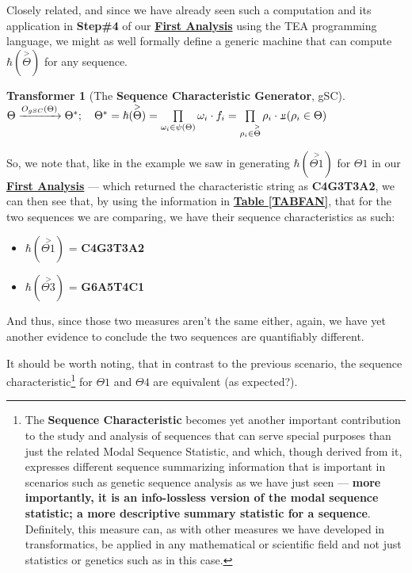 \documentclass[a4paper, 18pt]{book} %
\newtheorem{transf}{Transformer}
\newcommand{\invpi}{\rotatebox[origin=c]{180}{$\pi$}}
\begin{document}
Closely related, and since we have already seen such a computation and its application in \textbf{Step\#4} of our \textbf{\hyperref[SECFANAL]{First Analysis}} using the TEA programming language, we might as well formally define a generic machine that can compute $\hbar(\overset{>}{\Theta})$ for any sequence.\\

\begin{transf}[The \textbf{Sequence Characteristic Generator}, gSC]
\label{TRANSFGENSEQCHAR}
$ $\\
$\Theta \xrightarrow{O_{gSC}(\Theta)} \Theta^*; \quad \Theta^* = \hbar(\overset{>}{\Theta}) = \prod\limits_{\omega_i \in \psi(\Theta)} \omega_i\cdot f_i = \prod\limits_{\rho_i \in \overset{>}{\Theta}} \rho_i\cdot \invpi(\rho_i \in \Theta)$
\end{transf}

So, we note that, like in the example we saw in generating $\hbar(\overset{>}{\Theta1})$ for $\Theta1$ in our \textbf{\hyperref[SECFANAL]{First Analysis}} --- which returned the characteristic string as \textbf{C4G3T3A2}, we can then see that, by using the information in \textbf{\hyperref[TABFAN]{Table \ref{TABFAN}}}, that for the two sequences we are comparing, we have their sequence characteristics as such:

\begin{itemize}
\item $\hbar(\overset{>}{\Theta1})$ = \textbf{C4G3T3A2}
\item $\hbar(\overset{>}{\Theta3})$ = \textbf{G6A5T4C1}
\end{itemize}

And thus, since those two measures aren't the same either, again, we have yet another evidence to conclude the two sequences are quantifiably different.

It should be worth noting, that in contrast to the previous scenario, the sequence characteristic\footnote{The \textbf{Sequence Characteristic} becomes yet another important contribution to the study and analysis of sequences that can serve special purposes than just the related Modal Sequence Statistic, and which, though derived from it, expresses different sequence summarizing information that is important in scenarios such as genetic sequence analysis as we have just seen --- \textbf{more importantly, it is an info-lossless version of the modal sequence statistic; a more descriptive summary statistic for a sequence}. Definitely, this measure can, as with other measures we have developed in transformatics, be applied in any mathematical or scientific field and not just statistics or genetics such as in this case.} for $\Theta1$ and $\Theta4$ are equivalent (as expected?).
\end{document}
